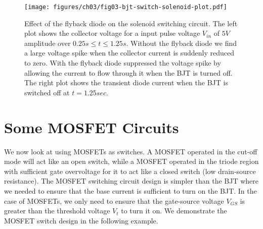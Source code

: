\begin{figure}[htbp]
    \centering
    \texttt{[image: figures/ch03/fig03-bjt-switch-solenoid-plot.pdf]}
    \caption{Effect of the flyback diode on the solenoid switching circuit. The left plot shows the collector voltage for a input pulse voltage $V_{in}$ of $5V$ amplitude over $0.25s \leq t \leq 1.25s$. Without the flyback diode we find a large voltage spike when the collector current is suddenly reduced to zero. With the flyback diode suppressed the voltage spike by allowing the current to flow through it when the BJT is turned off. The right plot shows the transient diode current when the BJT is switched off at $t=1.25sec$.}
    \label{fig:03-bjt-solenoid-plot}
\end{figure}

\section{Some MOSFET Circuits}
We now look at using MOSFETs as switches. A MOSFET operated in the cut-off mode will act like an open switch, while a MOSFET operated in the triode region with sufficient gate overvoltage for it to act like a closed switch (low drain-source resistance). The MOSFET switching circuit design is simpler than the BJT where we needed to ensure that the base current is sufficient to turn on the BJT. In the case of MOSFETs, we only need to ensure that the gate-source voltage $V_{GS}$ is greater than the threshold voltage $V_t$ to turn it on. We demonstrate the MOSFET switch design in the following example.

